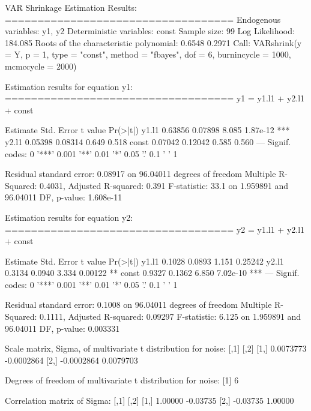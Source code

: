 \documentclass[
]{jss}
\begin{document}
\begin{CodeChunk}


\begin{CodeOutput}

VAR Shrinkage Estimation Results:
=================================== 
Endogenous variables: y1, y2 
Deterministic variables: const 
Sample size: 99 
Log Likelihood: 184.085 
Roots of the characteristic polynomial:
0.6548 0.2971
Call:
VARshrink(y = Y, p = 1, type = "const", method = "fbayes", dof = 6, 
    burnincycle = 1000, mcmccycle = 2000)


Estimation results for equation y1: 
=================================== 
y1 = y1.l1 + y2.l1 + const 

      Estimate Std. Error t value Pr(>|t|)    
y1.l1  0.63856    0.07898   8.085 1.87e-12 ***
y2.l1  0.05398    0.08314   0.649    0.518    
const  0.07042    0.12042   0.585    0.560    
---
Signif. codes:  0 '***' 0.001 '**' 0.01 '*' 0.05 '.' 0.1 ' ' 1


Residual standard error: 0.08917 on 96.04011 degrees of freedom
Multiple R-Squared: 0.4031, Adjusted R-squared: 0.391 
F-statistic:  33.1 on 1.959891 and 96.04011 DF,  p-value: 1.608e-11 


Estimation results for equation y2: 
=================================== 
y2 = y1.l1 + y2.l1 + const 

      Estimate Std. Error t value Pr(>|t|)    
y1.l1   0.1028     0.0893   1.151  0.25242    
y2.l1   0.3134     0.0940   3.334  0.00122 ** 
const   0.9327     0.1362   6.850 7.02e-10 ***
---
Signif. codes:  0 '***' 0.001 '**' 0.01 '*' 0.05 '.' 0.1 ' ' 1


Residual standard error: 0.1008 on 96.04011 degrees of freedom
Multiple R-Squared: 0.1111, Adjusted R-squared: 0.09297 
F-statistic: 6.125 on 1.959891 and 96.04011 DF,  p-value: 0.003331 



Scale matrix, Sigma, of multivariate t distribution for noise:
           [,1]       [,2]
[1,]  0.0073773 -0.0002864
[2,] -0.0002864  0.0079703

Degrees of freedom of multivariate t distribution for noise:
[1] 6

Correlation matrix of Sigma:
         [,1]     [,2]
[1,]  1.00000 -0.03735
[2,] -0.03735  1.00000
\end{CodeOutput}
\end{CodeChunk}
\end{document}
